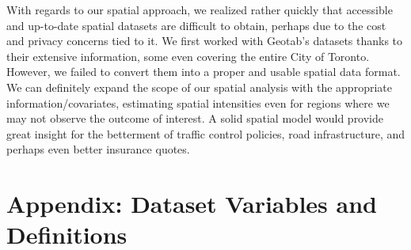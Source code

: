 \documentclass[]{article}
\begin{document}
With regards to our spatial approach, we realized rather quickly that
accessible and up-to-date spatial datasets are difficult to obtain,
perhaps due to the cost and privacy concerns tied to it. We first worked
with Geotab's datasets thanks to their extensive information, some even
covering the entire City of Toronto. However, we failed to convert them
into a proper and usable spatial data format. We can definitely expand
the scope of our spatial analysis with the appropriate
information/covariates, estimating spatial intensities even for regions
where we may not observe the outcome of interest. A solid spatial model
would provide great insight for the betterment of traffic control
policies, road infrastructure, and perhaps even better insurance quotes.

\section{Appendix: Dataset Variables and
Definitions}\label{appendix-dataset-variables-and-definitions}
\end{document}
